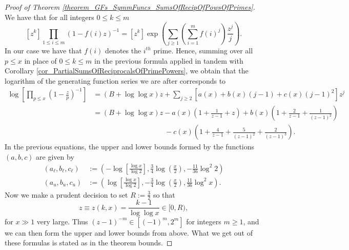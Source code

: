 \documentclass[11pt,reqno,a4letter]{article}
\numberwithin{figure}{section}
\numberwithin{table}{section}
\theoremstyle{plain}
\numberwithin{theorem}{section}
\theoremstyle{definition}
\begin{document}
\begin{proof}[Proof of Theorem \ref{theorem_GFs_SymmFuncs_SumsOfRecipOfPowsOfPrimes}] 
We have that for all integers $0 \leq k \leq m$
\[
[z^k] \prod_{1 \leq i \leq m} (1-f(i) z)^{-1} = [z^k] \exp\left(\sum_{j \geq 1} 
     \left(\sum_{i=1}^m f(i)^j\right) \frac{z^j}{j}\right). 
\]
In our case we have that $f(i)$ denotes the $i^{th}$ prime. Hence, summing over all $p \leq x$ 
in place of $0 \leq k \leq m$ in the previous formula applied in tandem with 
Corollary \ref{cor_PartialSumsOfReciprocalsOfPrimePowers}, we obtain that the logarithm of the 
generating function series we are after corresponds to 
\begin{align*} 
\log\left[\prod_{p \leq x} \left(1-\frac{z}{p}\right)^{-1}\right] & = (B + \log\log x) z + 
     \sum_{j \geq 2} \left[a(x) + b(x)(j-1) + c(x) (j-1)^2\right] z^j \\ 
     & = (B + \log\log x) z - a(x) \left(1 + \frac{1}{z-1} + z\right) + b(x) \left( 
     1 + \frac{2}{z-1} + \frac{1}{(z-1)^2}\right) \\ 
     & \phantom{= (B + \log\log x) z\ } - 
     c(x) \left( 
     1 + \frac{4}{z-1} + \frac{5}{(z-1)^2} + \frac{2}{(z-1)^3}\right). 
\end{align*} 
In the previous equations, the upper and lower bounds formed by the functions $(a,b,c)$ are 
given by 
\begin{align*} 
(a_{\ell}, b_{\ell}, c_{\ell}) & := \left(-\log\left[\frac{\log x}{\log 2}\right], 
     \frac{3}{4} \log\left(\frac{x}{2}\right), - \frac{11}{36} \log^2 2\right) \\ 
(a_u, b_u, c_u) & := \left(\log\left[\frac{\log x}{\log 2}\right], 
     -\frac{3}{4} \log\left(\frac{x}{2}\right), \frac{11}{36} \log^2 x\right). 
\end{align*} 
Now we make a prudent decision to set $R := \frac{3}{2}$ so that 
$$z \equiv z(k, x) = \frac{k-1}{\log\log x} \in [0, R),$$ for $x \gg 1$ very large. 
Thus $(z-1)^{-m} \in [(-1)^m, 2^m]$ for integers $m \geq 1$, and we can then form the upper and 
lower bounds from above. What we get out of these formulas is stated as in the theorem bounds. 
\end{proof} 
\end{document}
